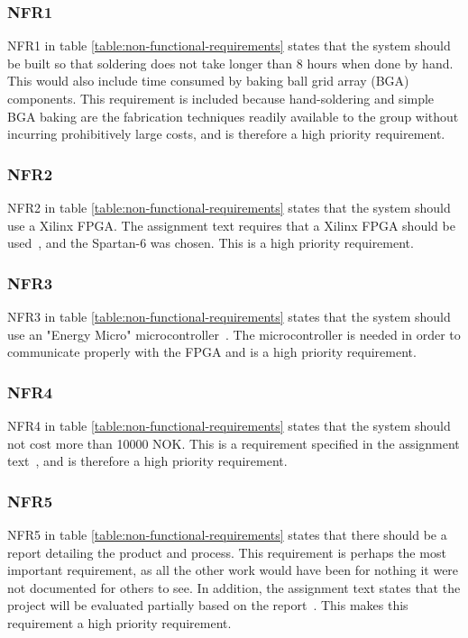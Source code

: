 \subsubsection{NFR1}

NFR1 in table \vref{table:non-functional-requirements} states that the system should be built so that soldering does not take longer than 8 hours when done by hand.
This would also include time consumed by baking ball grid array (BGA) components.
This requirement is included because hand-soldering and simple BGA baking are the fabrication techniques readily available to the group without incurring prohibitively large costs, and is therefore a high priority requirement.

\subsubsection{NFR2}

NFR2 in table \vref{table:non-functional-requirements} states that the system should use a Xilinx FPGA.
The assignment text requires that a Xilinx FPGA should be used~\cite{assignment-text}, and the Spartan-6 was chosen.
This is a high priority requirement. 

\subsubsection{NFR3}

NFR3 in table \vref{table:non-functional-requirements} states that the system should use an "Energy Micro" microcontroller~\cite{assignment-text}.
The microcontroller is needed in order to communicate properly with the FPGA and is a high priority requirement.


\subsubsection{NFR4}

NFR4 in table \vref{table:non-functional-requirements} states that the system should not cost more than 10000 NOK.
This is a requirement specified in the assignment text~\cite{assignment-text}, and is therefore a high priority requirement.

\subsubsection{NFR5}

NFR5 in table \vref{table:non-functional-requirements} states that there should be a report detailing the product and process.
This requirement is perhaps the most important requirement, as all the other work would have been for nothing it were not documented for others to see.
In addition, the assignment text states that the project will be evaluated partially based on the report~\cite{assignment-text}.
This makes this requirement a high priority requirement.


